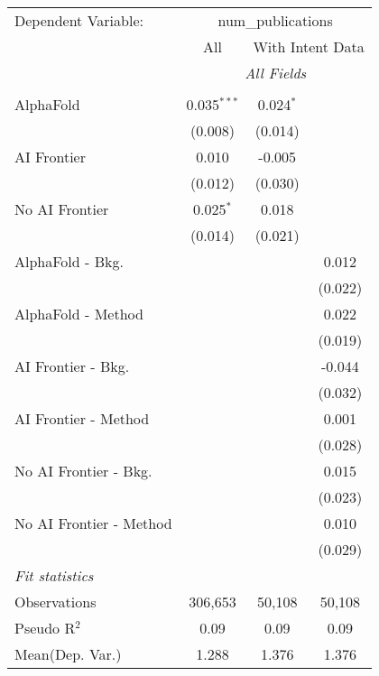 \begingroup
\centering
\begin{tabular}{lccc}
   \tabularnewline \midrule \midrule
   Dependent Variable: & \multicolumn{3}{c}{num\_publications}\\
 & \multicolumn{1}{c}{All} & \multicolumn{2}{c}{With Intent Data} \\
\cmidrule(lr){2-2} \cmidrule(lr){3-4}
 & \multicolumn{3}{c}{\textit{All Fields}} \\ \\
   AlphaFold               & 0.035$^{***}$ & 0.024$^{*}$ &   \\   
                           & (0.008)       & (0.014)     &   \\   
   AI Frontier             & 0.010         & -0.005      &   \\   
                           & (0.012)       & (0.030)     &   \\   
   No AI Frontier          & 0.025$^{*}$   & 0.018       &   \\   
                           & (0.014)       & (0.021)     &   \\   
   AlphaFold - Bkg.        &               &             & 0.012\\   
                           &               &             & (0.022)\\   
   AlphaFold - Method      &               &             & 0.022\\   
                           &               &             & (0.019)\\   
   AI Frontier - Bkg.      &               &             & -0.044\\   
                           &               &             & (0.032)\\   
   AI Frontier - Method    &               &             & 0.001\\   
                           &               &             & (0.028)\\   
   No AI Frontier - Bkg.   &               &             & 0.015\\   
                           &               &             & (0.023)\\   
   No AI Frontier - Method &               &             & 0.010\\   
                           &               &             & (0.029)\\   
   \midrule
   \emph{Fit statistics}\\
   Observations            & 306,653       & 50,108      & 50,108\\  
   Pseudo R$^2$            & 0.09          & 0.09        & 0.09\\  
Mean(Dep. Var.) & 1.288 & 1.376 & 1.376 \\
   

\end{tabular}
